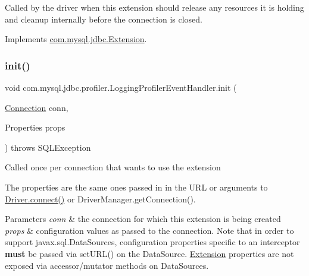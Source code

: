 Called by the driver when this extension should release any resources it is holding and cleanup internally before the connection is closed. 

Implements \mbox{\hyperlink{interfacecom_1_1mysql_1_1jdbc_1_1_extension_a7d9644de305efed5df71f3fcc7cc1772}{com.\+mysql.\+jdbc.\+Extension}}.

\mbox{\label{classcom_1_1mysql_1_1jdbc_1_1profiler_1_1_logging_profiler_event_handler_a2754871ca8890f78c4997b33ae32d925}} 
\subsubsection{\texorpdfstring{init()}{init()}}
{\footnotesize\ttfamily void com.\+mysql.\+jdbc.\+profiler.\+Logging\+Profiler\+Event\+Handler.\+init (\begin{DoxyParamCaption}\item[{\mbox{\hyperlink{interfacecom_1_1mysql_1_1jdbc_1_1_connection}{Connection}}}]{conn,  }\item[{Properties}]{props }\end{DoxyParamCaption}) throws S\+Q\+L\+Exception}

Called once per connection that wants to use the extension

The properties are the same ones passed in in the U\+RL or arguments to \mbox{\hyperlink{classcom_1_1mysql_1_1jdbc_1_1_non_registering_driver_a834c012e752a01d1ee435b3461bb8218}{Driver.\+connect()}} or Driver\+Manager.\+get\+Connection().


\begin{DoxyParams}{Parameters}
{\em conn} & the connection for which this extension is being created \\
\hline
{\em props} & configuration values as passed to the connection. Note that in order to support javax.\+sql.\+Data\+Sources, configuration properties specific to an interceptor {\bfseries must} be passed via set\+U\+R\+L() on the Data\+Source. \mbox{\hyperlink{interfacecom_1_1mysql_1_1jdbc_1_1_extension}{Extension}} properties are not exposed via accessor/mutator methods on Data\+Sources.\\
\hline
\end{DoxyParams}

